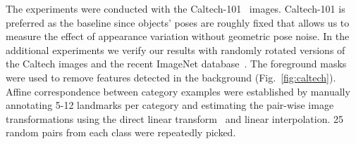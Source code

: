 \documentclass[review]{elsarticle}
\begin{document}
%
The experiments were conducted with the Caltech-101~\cite{FeiFerPer:2006} images.
Caltech-101 is preferred as the baseline
since objects' poses are roughly fixed that allows us to measure
the effect of appearance variation without geometric pose noise.
In the additional experiments we verify our results with randomly rotated
versions of the Caltech images and the recent
ImageNet database~\cite{imagenet}.
The foreground masks were used to remove features detected
in the background (Fig.~\ref{fig:caltech}). Affine correspondence between category examples were established
by manually annotating 5-12 landmarks per category and estimating the pair-wise image
transformations using the direct linear transform~\cite{HarZis:2003} and linear interpolation.
25 random pairs from each class were repeatedly picked.
\end{document}
